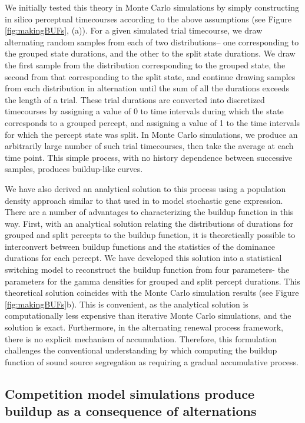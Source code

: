 We initially tested this theory in Monte Carlo simulations by simply constructing in silico perceptual timecourses according to the above assumptions (see Figure \ref{fig:makingBUFs}, (a)). For a given simulated trial timecourse, we draw alternating random samples from each of two distributions-- one corresponding to the grouped state durations, and the other to the split state durations. We draw the first sample from the distribution corresponding to the grouped state, the second from that corresponding to the split state, and continue drawing samples from each distribution in alternation until the sum of all the durations exceeds the length of a trial. These trial durations are converted into discretized timecourses by assigning a value of 0 to time intervals during which the state corresponds to a grouped percept, and assigning a value of 1 to the time intervals for which the percept state was split. In Monte Carlo simulations, we produce an arbitrarily large number of such trial timecourses, then take the average at each time point. This simple process, with no history dependence between successive samples, produces buildup-like curves.

We have also derived an analytical solution to this process using a population density approach similar to that used in \cite{Stinchcombe2012} to model stochastic gene expression. There are a number of advantages to characterizing the buildup function in this way. First, with an analytical solution relating the distributions of durations for grouped and split percepts to the buildup function, it is theoretically possible to interconvert between buildup functions and the statistics of the dominance durations for each percept. We have developed this solution into a statistical switching model to reconstruct the buildup function from four parameters- the parameters for the gamma densities for grouped and split percept durations. This theoretical solution coincides with the Monte Carlo simulation results  (see Figure \ref{fig:makingBUFs}b). This is convenient, as the analytical solution is computationally less expensive than iterative Monte Carlo simulations, and the solution is exact. Furthermore, in the alternating renewal process framework, there is no explicit mechanism of accumulation. Therefore, this formulation challenges the conventional understanding by which computing the buildup function of sound source segregation as requiring a gradual accumulative process.

\subsection{Competition model simulations produce buildup as a consequence of alternations} 

